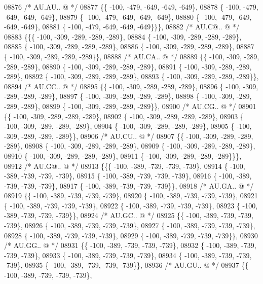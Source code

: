 \begin{DoxyCode}
08876 \textcolor{comment}{/* AU.AU.. @ */}
08877 \{\{ -100, -479, -649, -649, -649\},
08878 \{ -100, -479, -649, -649, -649\},
08879 \{ -100, -479, -649, -649, -649\},
08880 \{ -100, -479, -649, -649, -649\},
08881 \{ -100, -479, -649, -649, -649\}\}\},
08882 \textcolor{comment}{/* AU.C@.. @ */}
08883 \{\{\{ -100, -309, -289, -289, -289\},
08884 \{ -100, -309, -289, -289, -289\},
08885 \{ -100, -309, -289, -289, -289\},
08886 \{ -100, -309, -289, -289, -289\},
08887 \{ -100, -309, -289, -289, -289\}\},
08888 \textcolor{comment}{/* AU.CA.. @ */}
08889 \{\{ -100, -309, -289, -289, -289\},
08890 \{ -100, -309, -289, -289, -289\},
08891 \{ -100, -309, -289, -289, -289\},
08892 \{ -100, -309, -289, -289, -289\},
08893 \{ -100, -309, -289, -289, -289\}\},
08894 \textcolor{comment}{/* AU.CC.. @ */}
08895 \{\{ -100, -309, -289, -289, -289\},
08896 \{ -100, -309, -289, -289, -289\},
08897 \{ -100, -309, -289, -289, -289\},
08898 \{ -100, -309, -289, -289, -289\},
08899 \{ -100, -309, -289, -289, -289\}\},
08900 \textcolor{comment}{/* AU.CG.. @ */}
08901 \{\{ -100, -309, -289, -289, -289\},
08902 \{ -100, -309, -289, -289, -289\},
08903 \{ -100, -309, -289, -289, -289\},
08904 \{ -100, -309, -289, -289, -289\},
08905 \{ -100, -309, -289, -289, -289\}\},
08906 \textcolor{comment}{/* AU.CU.. @ */}
08907 \{\{ -100, -309, -289, -289, -289\},
08908 \{ -100, -309, -289, -289, -289\},
08909 \{ -100, -309, -289, -289, -289\},
08910 \{ -100, -309, -289, -289, -289\},
08911 \{ -100, -309, -289, -289, -289\}\}\},
08912 \textcolor{comment}{/* AU.G@.. @ */}
08913 \{\{\{ -100, -389, -739, -739, -739\},
08914 \{ -100, -389, -739, -739, -739\},
08915 \{ -100, -389, -739, -739, -739\},
08916 \{ -100, -389, -739, -739, -739\},
08917 \{ -100, -389, -739, -739, -739\}\},
08918 \textcolor{comment}{/* AU.GA.. @ */}
08919 \{\{ -100, -389, -739, -739, -739\},
08920 \{ -100, -389, -739, -739, -739\},
08921 \{ -100, -389, -739, -739, -739\},
08922 \{ -100, -389, -739, -739, -739\},
08923 \{ -100, -389, -739, -739, -739\}\},
08924 \textcolor{comment}{/* AU.GC.. @ */}
08925 \{\{ -100, -389, -739, -739, -739\},
08926 \{ -100, -389, -739, -739, -739\},
08927 \{ -100, -389, -739, -739, -739\},
08928 \{ -100, -389, -739, -739, -739\},
08929 \{ -100, -389, -739, -739, -739\}\},
08930 \textcolor{comment}{/* AU.GG.. @ */}
08931 \{\{ -100, -389, -739, -739, -739\},
08932 \{ -100, -389, -739, -739, -739\},
08933 \{ -100, -389, -739, -739, -739\},
08934 \{ -100, -389, -739, -739, -739\},
08935 \{ -100, -389, -739, -739, -739\}\},
08936 \textcolor{comment}{/* AU.GU.. @ */}
08937 \{\{ -100, -389, -739, -739, -739\},

\end{DoxyCode}
